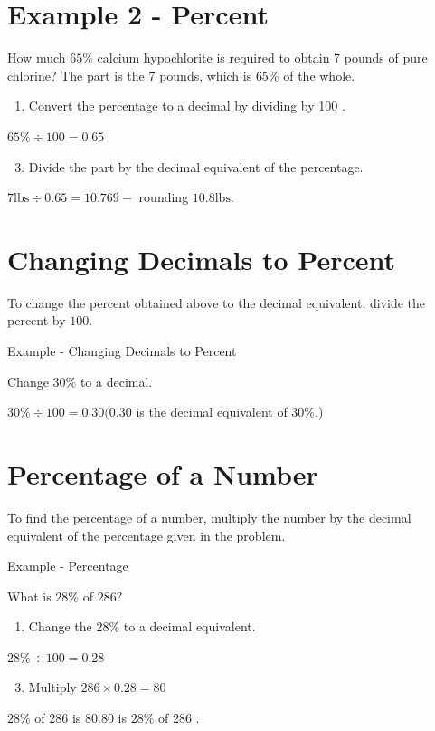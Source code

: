 \documentclass[10pt]{article}
\begin{document}
\section{Example 2 - Percent}
How much $65 \%$ calcium hypochlorite is required to obtain 7 pounds of pure chlorine? The part is the 7 pounds, which is $65 \%$ of the whole.

\begin{enumerate}
  \item Convert the percentage to a decimal by dividing by 100 .
\end{enumerate}
$65 \% \div 100=0.65$

\begin{enumerate}
  \setcounter{enumi}{2}
  \item Divide the part by the decimal equivalent of the percentage.
\end{enumerate}
$7 \mathrm{lbs} \div 0.65=10.769-$ rounding $10.8 \mathrm{lbs}$.

\section{Changing Decimals to Percent}
To change the percent obtained above to the decimal equivalent, divide the percent by $100 .$

Example - Changing Decimals to Percent

Change $30 \%$ to a decimal.

$30 \% \div 100=0.30(0.30$ is the decimal equivalent of $30 \%$.)

\section{Percentage of a Number}
To find the percentage of a number, multiply the number by the decimal equivalent of the percentage given in the problem.

Example - Percentage

What is $28 \%$ of $286 ?$

\begin{enumerate}
  \item Change the $28 \%$ to a decimal equivalent.
\end{enumerate}
$28 \% \div 100=0.28$

\begin{enumerate}
  \setcounter{enumi}{2}
  \item Multiply $286 \times 0.28=80$
\end{enumerate}
$28 \%$ of 286 is $80.80$ is $28 \%$ of 286 .
\end{document}
